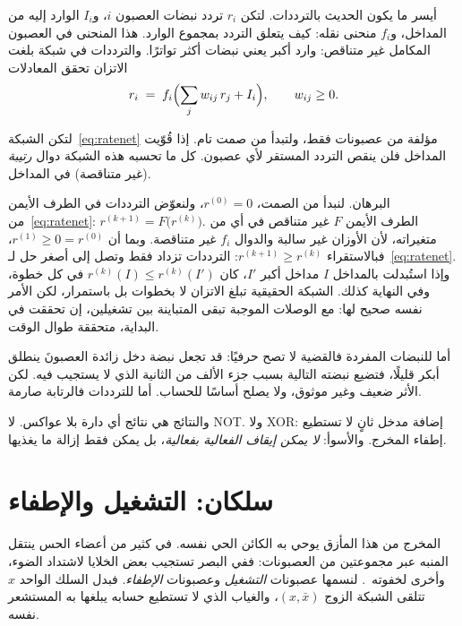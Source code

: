 أيسر ما يكون الحديث بالترددات. لتكن $r_i$ تردد نبضات العصبون $i$، و$I_i$ الوارد إليه من المداخل، و$f_i$ منحنى نقله: كيف يتعلق التردد بمجموع الوارد. هذا المنحنى في العصبون المكامل غير متناقص: وارد أكبر يعني نبضات أكثر تواترًا. والترددات في شبكة بلغت الاتزان تحقق المعادلات
\begin{equation}
r_i \;=\; f_i\Bigl(\sum_j w_{ij}\,r_j + I_i\Bigr), \qquad w_{ij}\ge 0 .
\label{eq:ratenet}
\end{equation}

\begin{keyblock}
\begin{proposition}[الرتابة]
\label{prop:monotone}
لتكن الشبكة~\eqref{eq:ratenet} مؤلفة من عصبونات  فقط، ولتبدأ من صمت تام. إذا قُوّيت المداخل فلن ينقص التردد المستقر لأي عصبون. كل ما تحسبه هذه الشبكة دوال \emph{رتيبة} (غير متناقصة) في المداخل.
\end{proposition}
\end{keyblock}

البرهان. لنبدأ من الصمت، $r^{(0)}=0$، ولنعوّض الترددات في الطرف الأيمن من~\eqref{eq:ratenet}: $r^{(k+1)}=F\bigl(r^{(k)}\bigr)$. الطرف الأيمن $F$ غير متناقص في أي من متغيراته، لأن الأوزان غير سالبة والدوال $f_i$ غير متناقصة. وبما أن $r^{(1)}\ge0=r^{(0)}$، فبالاستقراء $r^{(k+1)}\ge r^{(k)}$: الترددات تزداد فقط وتصل إلى أصغر حل لـ~\eqref{eq:ratenet}. وإذا استُبدلت بالمداخل $I$ مداخل أكبر $I'$، كان $r^{(k)}(I)\le r^{(k)}(I')$ في كل خطوة، وفي النهاية كذلك. الشبكة الحقيقية تبلغ الاتزان لا بخطوات بل باستمرار، لكن الأمر نفسه صحيح لها: مع الوصلات الموجبة تبقى المتباينة بين تشغيلين، إن تحققت في البداية، متحققة طوال الوقت.

أما للنبضات المفردة فالقضية لا تصح حرفيًا: قد تجعل نبضة دخل زائدة العصبونَ ينطلق أبكر قليلًا، فتضيع نبضته التالية بسبب جزء الألف من الثانية الذي لا يستجيب فيه. لكن الأثر ضعيف وغير موثوق، ولا يصلح أساسًا للحساب. أما للترددات فالرتابة صارمة.

والنتائج هي نتائج أي دارة بلا عواكس. لا \foreignlanguage{english}{NOT}. ولا \foreignlanguage{english}{XOR}: إضافة مدخل ثانٍ لا تستطيع إطفاء المخرج. والأسوأ: \emph{لا يمكن إيقاف الفعالية بفعالية}، بل يمكن فقط إزالة ما يغذيها.

\section{سلكان: التشغيل والإطفاء}

المخرج من هذا المأزق يوحي به الكائن الحي نفسه. في كثير من أعضاء الحس ينتقل المنبه عبر مجموعتين من العصبونات: ففي البصر تستجيب بعض الخلايا لاشتداد الضوء، وأخرى لخفوته~\cite{Schiller1992}. لنسمها عصبونات \emph{التشغيل} وعصبونات \emph{الإطفاء}. فبدل السلك الواحد $x$ تتلقى الشبكة الزوج $(x,\bar x)$، والغياب الذي لا تستطيع حسابه يبلغها به المستشعر نفسه.

